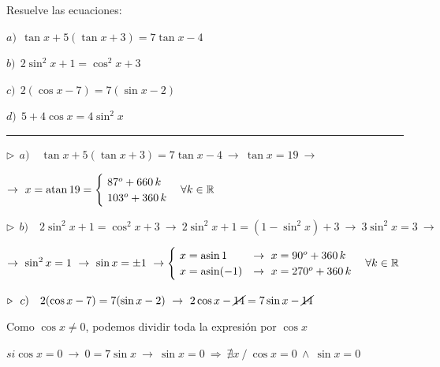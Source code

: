 \vspace{4mm}
\begin{miejercicio}

Resuelve las ecuaciones: 

\begin{multicols}{2}
\vspace{2mm} $a)\ \ \tan x + 5(\tan x + 3)=7\tan x - 4$

\vspace{2mm} $b)\ \ 2\sin^2 x+1=\cos^2 x+3 $

\vspace{2mm} $c)\ \ 2(\cos x-7)=7(\sin x-2)$

\vspace{2mm} $d)\ \ 5+4\cos x=4\sin^2 x$	
\end{multicols}


\rule{250pt}{0.1pt}	

\vspace{4mm} $\triangleright \ \ a)\quad \tan x + 5(\tan x + 3)=7\tan x - 4 \ \to \ \tan x=19 \ \to $

\vspace{2mm}$\to \ x=\atan 19 = \begin{cases} \ 87^o+660\, k \\ \ 103^o +360 \, k \end{cases} \forall k \in \mathbb R$



\vspace{4mm} $\triangleright \ \ b)\quad 2\sin^2 x+1=\cos^2 x+3 \ \to \ 2\sin^2 x+1=(1-\sin^2 x) +3 \ \to \ 3\sin^2 x=3 \ \to \ $

\vspace{2mm}$\to \ \sin^2 x=1 \ \to \ \sin x=\pm 1 \ \to \begin{cases}
 \ x=\asin 1  &\to \ x=90^o+360\, k
 \\
 \ x=\asin (-1) &\to \ x=270^o+360\, k 
 \end{cases} \quad \forall k \in \mathbb R$


\vspace{4mm} $\triangleright \ \ c)\quad 2(\cos x-7)=7(\sin x-2)  \ \to \ 2\cos x - \cancel{14}=7\sin x - \cancel {14}$

\vspace{2mm} Como $\cos x\neq 0$, podemos dividir toda la expresión por $\cos x$

\vspace{2mm} \textcolor{gris}{$si \cos x=0 \ \to \ 0=7\sin x\ \to \ \sin x = 0 \ \Rightarrow \ \nexists x\  / \ \cos x=0 \ \wedge \ \sin x=0$ }


\end{miejercicio}

